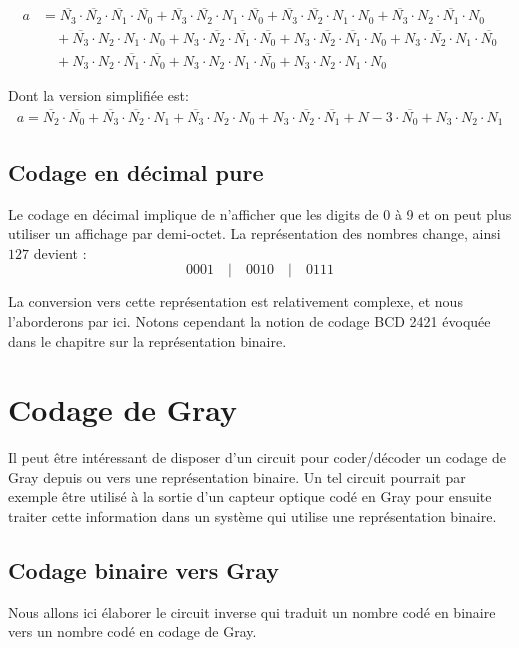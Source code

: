 \documentclass{book}
\theoremstyle{definition}
\theoremstyle{definition}
\begin{document}
\begin{align*}
a &= \overline{N_3}\cdot\overline{N_2}\cdot\overline{N_1}\cdot\overline{N_0} + \overline{N_3}\cdot\overline{N_2}\cdot N_1\cdot\overline{N_0} + \overline{N_3}\cdot\overline{N_2}\cdot N_1\cdot N_0 + \overline{N_3}\cdot N_2\cdot\overline{N_1}\cdot N_0 \\
&\quad + \overline{N_3}\cdot N_2\cdot N_1\cdot N_0 + N_3\cdot\overline{N_2}\cdot\overline{N_1}\cdot\overline{N_0} + N_3\cdot\overline{N_2}\cdot\overline{N_1}\cdot N_0 + N_3\cdot\overline{N_2}\cdot N_1\cdot\overline{N_0}\\
&\quad+ N_3\cdot N_2\cdot\overline{N_1}\cdot\overline{N_0} + N_3\cdot N_2\cdot N_1\cdot\overline{N_0}
+ N_3\cdot N_2\cdot N_1\cdot N_0
\end{align*}

Dont la version simplifiée est:
\begin{align*}
a = \overline{N_2}\cdot\overline{N_0} + \overline{N_3}\cdot\overline{N_2}\cdot N_1 + \overline{N_3}\cdot N_2 \cdot N_0 + N_3 \cdot\overline{N_2}\cdot\overline{N_1} + N-3 \cdot\overline{N_0} + N_3 \cdot N_2 \cdot N_1
\end{align*}

\subsection{Codage en décimal pure}
Le codage en décimal implique de n'afficher que les digits de 0 à 9 et on peut plus utiliser un affichage par demi-octet. La représentation des nombres change, ainsi $127$ devient : 
\[
0001\quad|\quad0010\quad|\quad 0111
\]

La conversion vers cette représentation est relativement complexe, et nous l'aborderons par ici. Notons cependant la notion de codage BCD 2421 évoquée dans le chapitre sur la représentation binaire.

\section{Codage de Gray}
Il peut être intéressant de disposer d'un circuit pour coder/décoder un codage de Gray depuis ou vers une représentation binaire. Un tel circuit pourrait par exemple être utilisé à la sortie d'un capteur optique codé en Gray pour ensuite traiter cette information dans un système qui utilise une représentation binaire. 
\subsection{Codage binaire vers Gray}
Nous allons ici élaborer le circuit inverse qui traduit un nombre codé en binaire vers un nombre codé en codage de Gray.
\end{document}
